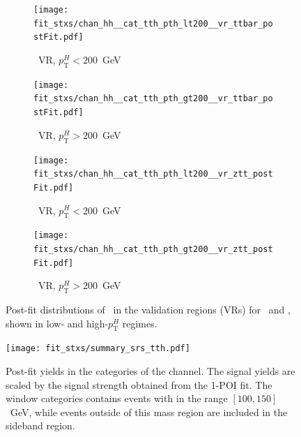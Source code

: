 \begin{figure}[htbp]
  \centering

  \begin{subfigure}[b]{0.48\textwidth}
    \centering
    \texttt{[image: fit\_stxs/chan\_hh\_\_cat\_tth\_pth\_lt200\_\_vr\_ttbar\_postFit.pdf]}
    \caption{\small \ttbar\ VR, $p_{\text{T}}^{H}<200$~GeV}
    \label{fig:postfit_vr_ttbar_lt200}
  \end{subfigure}\hfill
  \begin{subfigure}[b]{0.48\textwidth}
    \centering
    \texttt{[image: fit\_stxs/chan\_hh\_\_cat\_tth\_pth\_gt200\_\_vr\_ttbar\_postFit.pdf]}
    \caption{\small \ttbar\ VR, $p_{\text{T}}^{H}>200$~GeV}
    \label{fig:postfit_vr_ttbar_gt200}
  \end{subfigure}

  \vspace{0.45cm}

  \begin{subfigure}[b]{0.48\textwidth}
    \centering
    \texttt{[image: fit\_stxs/chan\_hh\_\_cat\_tth\_pth\_lt200\_\_vr\_ztt\_postFit.pdf]}
    \caption{\small \ztautau\ VR, $p_{\text{T}}^{H}<200$~GeV}
    \label{fig:postfit_vr_ztt_lt200}
  \end{subfigure}\hfill
  \begin{subfigure}[b]{0.48\textwidth}
    \centering
    \texttt{[image: fit\_stxs/chan\_hh\_\_cat\_tth\_pth\_gt200\_\_vr\_ztt\_postFit.pdf]}
    \caption{\small \ztautau\ VR, $p_{\text{T}}^{H}>200$~GeV}
    \label{fig:postfit_vr_ztt_gt200}
  \end{subfigure}

  \caption{Post-fit distributions of \mmc\ in the validation regions (VRs) for \ttbar\ and \ztautau, shown in low- and high-$p_{\text{T}}^{H}$ regimes.}
  \label{fig:postfit_vr_all}
\end{figure}

\begin{figure}[htbp]
  \centering
  \texttt{[image: fit\_stxs/summary\_srs\_tth.pdf]}
  \caption{Post-fit yields in the \ttH categories of the \tauhadhad channel. The
  signal yields are scaled by the signal strength obtained from the 1-POI fit. The
  window categories contains events with \mtt in the range $[100, 150]$~GeV, while
  events outside of this mass region are included in the sideband region.}
  \label{fig:summary_all}
\end{figure}

